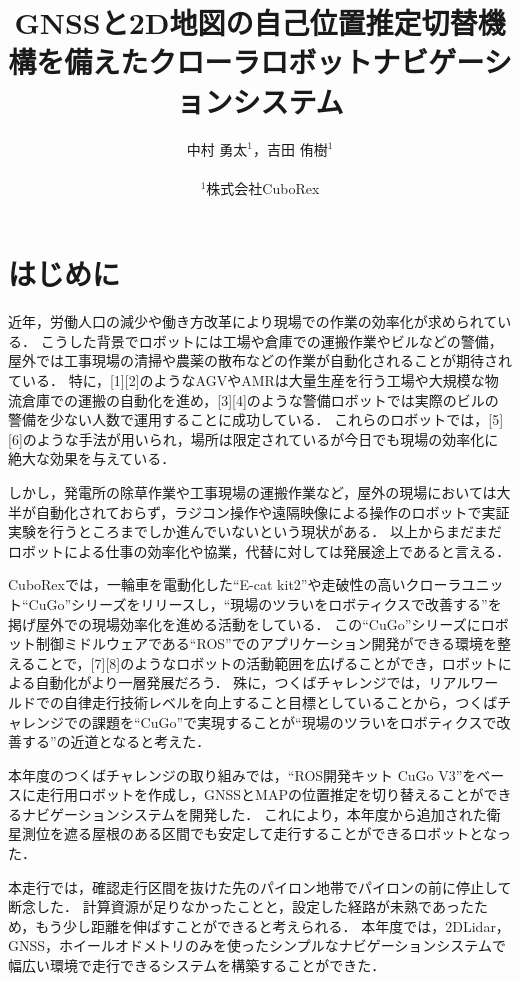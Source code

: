 \documentclass[platex,dvipdfmx]{rbproceedings}
\title{GNSSと2D地図の自己位置推定切替機構を備えたクローラロボットナビゲーションシステム}
\author{%
中村 勇太${}^{1}$，吉田 侑樹${}^{1}$\\ \\
${}^{1}$株式会社CuboRex
}
\begin{document}
\maketitle


\section{はじめに}
近年，労働人口の減少や働き方改革により現場での作業の効率化が求められている．
こうした背景でロボットには工場や倉庫での運搬作業やビルなどの警備，屋外では工事現場の清掃や農薬の散布などの作業が自動化されることが期待されている．
特に，[1][2]のようなAGVやAMRは大量生産を行う工場や大規模な物流倉庫での運搬の自動化を進め，[3][4]のような警備ロボットでは実際のビルの警備を少ない人数で運用することに成功している．
これらのロボットでは，[5][6]のような手法が用いられ，場所は限定されているが今日でも現場の効率化に絶大な効果を与えている．

しかし，発電所の除草作業や工事現場の運搬作業など，屋外の現場においては大半が自動化されておらず，ラジコン操作や遠隔映像による操作のロボットで実証実験を行うところまでしか進んでいないという現状がある．
以上からまだまだロボットによる仕事の効率化や協業，代替に対しては発展途上であると言える．

CuboRexでは，一輪車を電動化した“E-cat kit2”や走破性の高いクローラユニット“CuGo”シリーズをリリースし，“現場のツラいをロボティクスで改善する”を掲げ屋外での現場効率化を進める活動をしている．
この“CuGo”シリーズにロボット制御ミドルウェアである“ROS”でのアプリケーション開発ができる環境を整えることで，[7][8]のようなロボットの活動範囲を広げることができ，ロボットによる自動化がより一層発展だろう．
殊に，つくばチャレンジでは，リアルワールドでの自律走行技術レベルを向上すること目標としていることから，つくばチャレンジでの課題を“CuGo”で実現することが“現場のツラいをロボティクスで改善する”の近道となると考えた．

本年度のつくばチャレンジの取り組みでは，“ROS開発キット CuGo V3”をベースに走行用ロボットを作成し，GNSSとMAPの位置推定を切り替えることができるナビゲーションシステムを開発した．
これにより，本年度から追加された衛星測位を遮る屋根のある区間でも安定して走行することができるロボットとなった．

本走行では，確認走行区間を抜けた先のパイロン地帯でパイロンの前に停止して断念した．
計算資源が足りなかったことと，設定した経路が未熟であったため，もう少し距離を伸ばすことができると考えられる．
本年度では，2DLidar，GNSS，ホイールオドメトリのみを使ったシンプルなナビゲーションシステムで幅広い環境で走行できるシステムを構築することができた．
\end{document}
